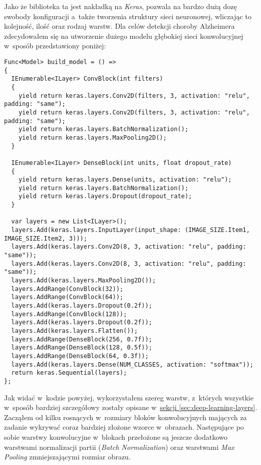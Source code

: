 Jako że biblioteka ta jest nakładką na \emph{Keras}, pozwala na bardzo dużą dozę swobody konfiguracji a~także tworzenia struktury sieci neuronowej, wliczając to kolejność, ilość oraz rodzaj warstw.
Dla celów detekcji choroby Alzheimera zdecydowałem się na utworzenie dużego modelu głębokiej sieci konwolucyjnej w~sposób przedstawiony poniżej:

\begin{lstlisting}[language={[Sharp]C}]
Func<Model> build_model = () =>
{
  IEnumerable<ILayer> ConvBlock(int filters)
  {
    yield return keras.layers.Conv2D(filters, 3, activation: "relu", padding: "same");
    yield return keras.layers.Conv2D(filters, 3, activation: "relu", padding: "same");
    yield return keras.layers.BatchNormalization();
    yield return keras.layers.MaxPooling2D();
  }

  IEnumerable<ILayer> DenseBlock(int units, float dropout_rate)
  {
    yield return keras.layers.Dense(units, activation: "relu");
    yield return keras.layers.BatchNormalization();
    yield return keras.layers.Dropout(dropout_rate);
  }

  var layers = new List<ILayer>();
  layers.Add(keras.layers.InputLayer(input_shape: (IMAGE_SIZE.Item1, IMAGE_SIZE.Item2, 3)));
  layers.Add(keras.layers.Conv2D(8, 3, activation: "relu", padding: "same"));
  layers.Add(keras.layers.Conv2D(8, 3, activation: "relu", padding: "same"));
  layers.Add(keras.layers.MaxPooling2D());
  layers.AddRange(ConvBlock(32));
  layers.AddRange(ConvBlock(64));
  layers.Add(keras.layers.Dropout(0.2f));
  layers.AddRange(ConvBlock(128));
  layers.Add(keras.layers.Dropout(0.2f));
  layers.Add(keras.layers.Flatten());
  layers.AddRange(DenseBlock(256, 0.7f));
  layers.AddRange(DenseBlock(128, 0.5f));
  layers.AddRange(DenseBlock(64, 0.3f));
  layers.Add(keras.layers.Dense(NUM_CLASSES, activation: "softmax"));
  return keras.Sequential(layers);
};
\end{lstlisting}

Jak widać w~kodzie powyżej, wykorzystałem szereg warstw, z~których wszystkie w~sposób bardziej szczegółowy zostały opisane w~\hyperref[sec:deep-learning-layers]{sekcji \ref*{sec:deep-learning-layers}}.
Zacząłem od kilku rosnących w~rozmiary bloków konwolucyjnych mających za zadanie wykrywać coraz bardziej złożone wzorce w~obrazach.
Następujące po sobie warstwy konwolucyjne w~blokach przełożone są jeszcze dodatkowo warstwami normalizacji partii (\emph{Batch Normalization}) oraz warstwami \emph{Max Pooling} zmniejszającymi rozmiar obrazu.

